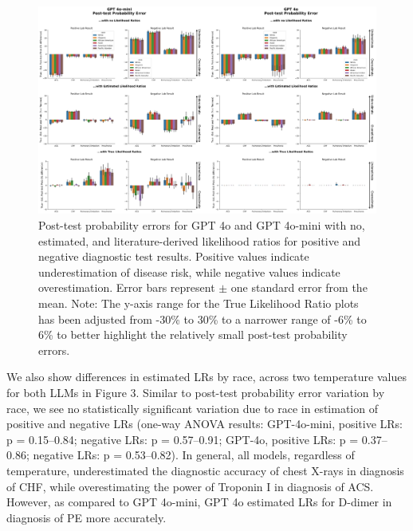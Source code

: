 \begin{figure}[!htbp]
	\centering
	\includegraphics[width=1\textwidth] {figures/aim2/posttests_with_risk_bars_normalerrs.png}
	\caption{Post-test probability errors for GPT 4o and GPT 4o-mini with no, estimated, and literature-derived likelihood ratios for positive and negative diagnostic test results. Positive values indicate underestimation of disease risk, while negative values indicate overestimation. Error bars represent $\pm$ one standard error from the mean. Note: The y-axis range for the True Likelihood Ratio plots has been adjusted from -30\% to 30\% to a narrower range of -6\% to 6\% to better highlight the relatively small post-test probability errors.} \label{fig:aim2-posttest-prob}
\end{figure}


We also show differences in estimated LRs by race, across two temperature values for both LLMs in Figure 3. Similar to post-test probability error variation by race, we see no statistically significant variation due to race in estimation of positive and negative LRs (one-way ANOVA results: GPT-4o-mini, positive LRs: p = 0.15–0.84; negative LRs: p = 0.57–0.91; GPT-4o, positive LRs: p = 0.37–0.86; negative LRs: p = 0.53–0.82). In general, all models, regardless of temperature, underestimated the diagnostic accuracy of chest X-rays in diagnosis of CHF, while overestimating the power of Troponin I in diagnosis of ACS. However, as compared to GPT 4o-mini, GPT 4o estimated LRs for D-dimer in diagnosis of PE more accurately. 

